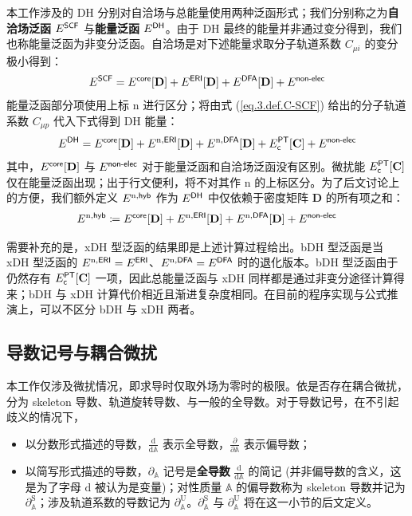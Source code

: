 本工作涉及的 DH 分别对自洽场与总能量使用两种泛函形式；我们分别称之为\textbf{自洽场泛函} $E^{\textsf{SCF}}$ 与\textbf{能量泛函} $E^{\textsf{DH}}$。由于 DH 最终的能量并非通过变分得到，我们也称能量泛函为非变分泛函。自洽场是对下述能量求取分子轨道系数 $C_{\mu i}$ 的变分极小得到：
\begin{equation}
    \label{eq.3.def.eng-SCF}
    E^{\textsf{SCF}} = E^{\textsf{core}} [\mathbf{D}] + E^{\textsf{ERI}} [\mathbf{D}] + E^{\textsf{DFA}} [\mathbf{D}] + E^{\textsf{non-elec}}
\end{equation}
能量泛函部分项使用上标 $\mathrm{n}$ 进行区分；将由式 (\ref{eq.3.def.C-SCF}) 给出的分子轨道系数 $C_{\mu p}$ 代入下式得到 DH 能量：
\begin{equation}
    \label{eq.3.def.eng-DH}
    E^{\textsf{DH}} = E^{\textsf{core}} [\mathbf{D}] + E^{\mathrm{n}, \textsf{ERI}} [\mathbf{D}] + E^{\mathrm{n}, \textsf{DFA}} [\mathbf{D}] + E_{\textsf{c}}^{\textsf{PT}} [\mathbf{C}] + E^{\textsf{non-elec}}
\end{equation}
其中，$E^{\textsf{core}} [\mathbf{D}]$ 与 $E^{\textsf{non-elec}}$ 对于能量泛函和自洽场泛函没有区别。微扰能 $E_{\textsf{c}}^{\textsf{PT}} [\mathbf{C}]$ 仅在能量泛函出现；出于行文便利，将不对其作 $\mathrm{n}$ 的上标区分。为了后文讨论上的方便，我们额外定义 $E^{\mathrm{n}, \textsf{hyb}}$ 作为 $E^{\textsf{DH}}$ 中仅依赖于密度矩阵 $\mathbf{D}$ 的所有项之和：
\begin{equation}
    \label{eq.3.def.eng-n-hyb}
    E^{\mathrm{n}, \textsf{hyb}} \coloneq E^{\textsf{core}} [\mathbf{D}] + E^{\mathrm{n}, \textsf{ERI}} [\mathbf{D}] + E^{\mathrm{n}, \textsf{DFA}} [\mathbf{D}] + E^{\textsf{non-elec}}
\end{equation}

需要补充的是，xDH 型泛函的结果即是上述计算过程给出。bDH 型泛函是当 xDH 型泛函的 $E^{\mathrm{n}, \textsf{ERI}} = E^{\textsf{ERI}}$、$E^{\mathrm{n}, \textsf{DFA}} = E^{\textsf{DFA}}$ 时的退化版本。bDH 型泛函由于仍然存有 $E_{\textsf{c}}^{\textsf{PT}} [\mathbf{C}]$ 一项，因此总能量泛函与 xDH 同样都是通过非变分途径计算得来；bDH 与 xDH 计算代价相近且渐进复杂度相同。在目前的程序实现与公式推演上，可以不区分 bDH 与 xDH 两者。

\subsection{导数记号与耦合微扰}

本工作仅涉及微扰情况，即求导时仅取外场为零时的极限。依是否存在耦合微扰，分为 skeleton 导数、轨道旋转导数、与一般的全导数。对于导数记号，在不引起歧义的情况下，
\begin{itemize}[nosep]
    \item 以分数形式描述的导数，$\frac{\mathrm{d}}{\mathrm{d} \mathbb{A}}$ 表示全导数，$\frac{\partial}{\partial \mathbb{A}}$ 表示偏导数；
    \item 以简写形式描述的导数，$\partial_\mathbb{A}$ 记号是\textbf{全导数} $\frac{\mathrm{d}}{\mathrm{d} \mathbb{A}}$ 的简记 (并非偏导数的含义，这是为了字母 $\mathrm{d}$ 被认为是变量)；对性质量 $\mathbb{A}$ 的偏导数称为 skeleton 导数并记为 $\partial_\mathbb{A}^{\mathrm{S}}$；涉及轨道系数的导数记为 $\partial_\mathbb{A}^{\mathrm{U}}$。$\partial_\mathbb{A}^{\mathrm{S}}$ 与 $\partial_\mathbb{A}^{\mathrm{U}}$ 将在这一小节的后文定义。
\end{itemize}

